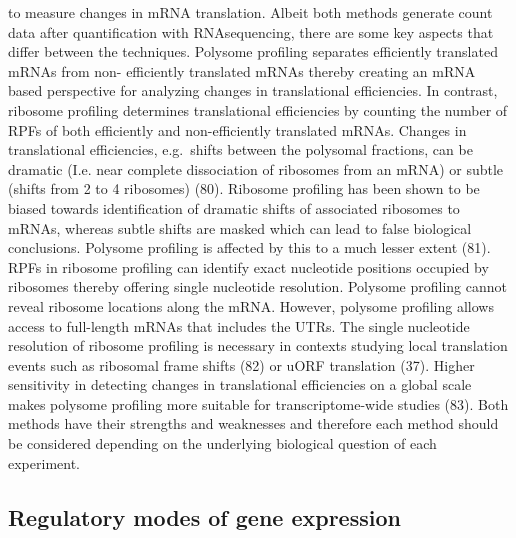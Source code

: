 \documentclass[12pt,openany]{book}
\begin{document}
to measure changes in mRNA translation. Albeit both methods generate
count data after quantification with RNAsequencing, there are some key
aspects that differ between the techniques. Polysome profiling separates
efficiently translated mRNAs from non- efficiently translated mRNAs
thereby creating an mRNA based perspective for analyzing changes in
translational efficiencies. In contrast, ribosome profiling determines
translational efficiencies by counting the number of RPFs of both
efficiently and non-efficiently translated mRNAs. Changes in
translational efficiencies, e.g.~shifts between the polysomal fractions,
can be dramatic (I.e. near complete dissociation of ribosomes from an
mRNA) or subtle (shifts from 2 to 4 ribosomes) (80). Ribosome profiling
has been shown to be biased towards identification of dramatic shifts of
associated ribosomes to mRNAs, whereas subtle shifts are masked which
can lead to false biological conclusions. Polysome profiling is affected
by this to a much lesser extent (81). RPFs in ribosome profiling can
identify exact nucleotide positions occupied by ribosomes thereby
offering single nucleotide resolution. Polysome profiling cannot reveal
ribosome locations along the mRNA. However, polysome profiling allows
access to full-length mRNAs that includes the UTRs. The single
nucleotide resolution of ribosome profiling is necessary in contexts
studying local translation events such as ribosomal frame shifts (82) or
uORF translation (37). Higher sensitivity in detecting changes in
translational efficiencies on a global scale makes polysome profiling
more suitable for transcriptome-wide studies (83). Both methods have
their strengths and weaknesses and therefore each method should be
considered depending on the underlying biological question of each
experiment.

\subsection{Regulatory modes of gene expression}
\end{document}
